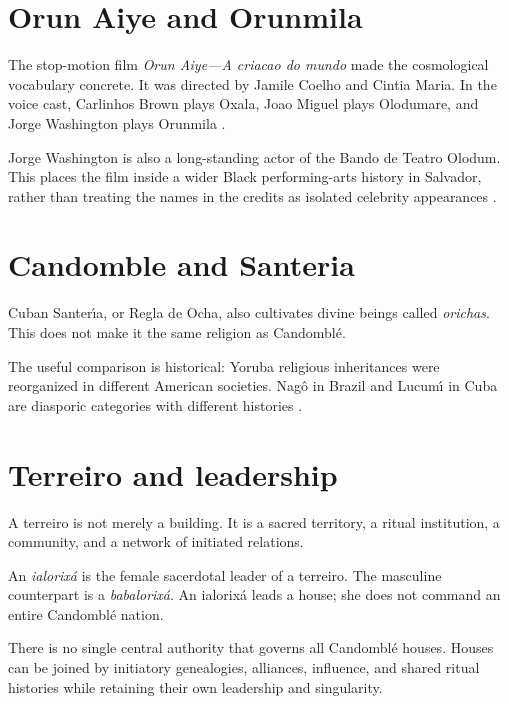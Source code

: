 \section{Orun Aiye and Orunmila}
\label{section-orun-aiye-film}

The stop-motion film
\emph{Orun Aiye---A criacao do mundo}
made the cosmological vocabulary concrete.
It was directed by Jamile Coelho and Cintia
Maria.  In the voice cast, Carlinhos Brown
plays Oxala, Joao Miguel plays Olodumare,
and Jorge Washington plays Orunmila
\cite{orun-aiye-sepromi}.

Jorge Washington is also a long-standing
actor of the Bando de Teatro Olodum.  This
places the film inside a wider Black
performing-arts history in Salvador, rather
than treating the names in the credits as
isolated celebrity appearances
\cite{bando-jorge-washington}.

\section{Candomble and Santeria}
\label{section-candomble-santeria}

Cuban Santer\'\i a, or Regla de Ocha, also
cultivates divine beings called
\emph{orichas}.  This does not make it the
same religion as Candombl\'e.

The useful comparison is historical:
Yoruba religious inheritances were
reorganized in different American
societies.  Nag\^o in Brazil and Lucum\'\i
in Cuba are diasporic categories with
different histories
\cite{lovejoyojo2015lucumi}.

\section{Terreiro and leadership}
\label{section-terreiro-leadership}

A terreiro is not merely a building.  It is
a sacred territory, a ritual institution,
a community, and a network of initiated
relations.

An \emph{ialorix\'a} is the female
sacerdotal leader of a terreiro.  The
masculine counterpart is a
\emph{babalorix\'a}.  An ialorix\'a leads a
house; she does not command an entire
Candombl\'e nation.

There is no single central authority that
governs all Candombl\'e houses.  Houses can
be joined by initiatory genealogies,
alliances, influence, and shared ritual
histories while retaining their own
leadership and singularity.

